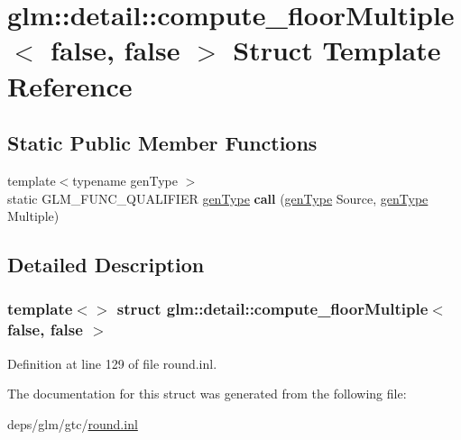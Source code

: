 \hypertarget{structglm_1_1detail_1_1compute__floorMultiple_3_01false_00_01false_01_4}{}\section{glm\+:\+:detail\+:\+:compute\+\_\+floor\+Multiple$<$ false, false $>$ Struct Template Reference}
\label{structglm_1_1detail_1_1compute__floorMultiple_3_01false_00_01false_01_4}
\subsection*{Static Public Member Functions}
\begin{DoxyCompactItemize}
\item 
\mbox{\label{structglm_1_1detail_1_1compute__floorMultiple_3_01false_00_01false_01_4_a795b0efa8ebff0dcbbc055cdccd2156c}} 
{\footnotesize template$<$typename gen\+Type $>$ }\\static G\+L\+M\+\_\+\+F\+U\+N\+C\+\_\+\+Q\+U\+A\+L\+I\+F\+I\+ER \hyperlink{structglm_1_1detail_1_1genType}{gen\+Type} {\bfseries call} (\hyperlink{structglm_1_1detail_1_1genType}{gen\+Type} Source, \hyperlink{structglm_1_1detail_1_1genType}{gen\+Type} Multiple)
\end{DoxyCompactItemize}


\subsection{Detailed Description}
\subsubsection*{template$<$$>$\newline
struct glm\+::detail\+::compute\+\_\+floor\+Multiple$<$ false, false $>$}



Definition at line 129 of file round.\+inl.



The documentation for this struct was generated from the following file\+:\begin{DoxyCompactItemize}
\item 
deps/glm/gtc/\hyperlink{round_8inl}{round.\+inl}\end{DoxyCompactItemize}
